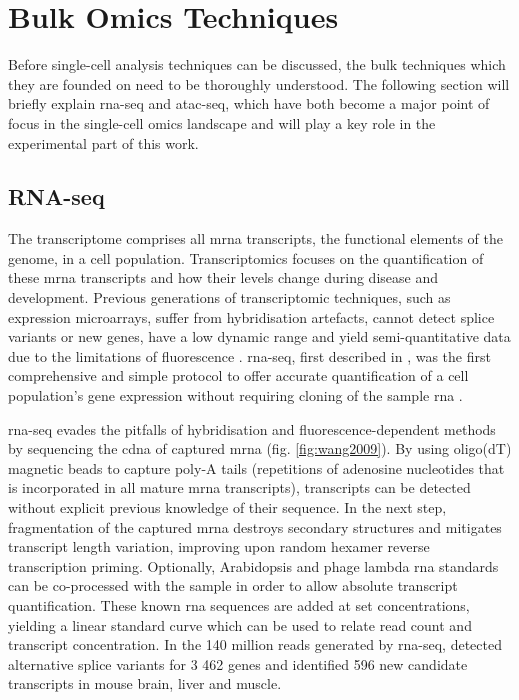 %

\newpage
\section{Bulk Omics Techniques}
\label{sec:lit_bulk}
Before single-cell analysis techniques can be discussed, the bulk techniques which they are founded on need to be thoroughly understood. The following section will briefly explain \acrshort{rna-seq} and \acrshort{atac-seq}, which have both become a major point of focus in the single-cell omics landscape and will play a key role in the experimental part of this work.\pms

\subsection{RNA-seq}
\label{subsect:lit_rna-seq}
The transcriptome comprises all \acrshort{mrna} transcripts, the functional elements of the genome, in a cell population. Transcriptomics focuses on the quantification of these \acrshort{mrna} transcripts and how their levels change during disease and development. Previous generations of transcriptomic techniques, such as expression microarrays, suffer from hybridisation artefacts, cannot detect splice variants or new genes, have a low dynamic range and yield semi-quantitative data due to the limitations of fluorescence \citep{wang2009, tang2011}. \acrshort{rna-seq}, first described in \citeyear{mortazavi2008}, was the first comprehensive and simple protocol to offer accurate quantification of a cell population's gene expression without requiring cloning of the sample \acrshort{rna} \citep{mortazavi2008}.\pms

\acrshort{rna-seq} evades the pitfalls of hybridisation and fluorescence-dependent methods by sequencing the \acrshort{cdna} of captured \acrshort{mrna} (fig. \ref{fig:wang2009}). By using oligo(dT) magnetic beads to capture poly-A tails (repetitions of adenosine nucleotides that is incorporated in all mature \acrshort{mrna} transcripts), transcripts can be detected without explicit previous knowledge of their sequence. In the next step, fragmentation of the captured \acrshort{mrna} destroys secondary structures and mitigates transcript length variation, improving upon random hexamer reverse transcription priming. Optionally, Arabidopsis and phage lambda \acrshort{rna} standards can be co-processed with the sample in order to allow absolute transcript quantification. These known \acrshort{rna} sequences are added at set concentrations, yielding a linear standard curve which can be used to relate read count and transcript concentration. In the 140 million reads generated by \acrshort{rna-seq}, \citeauthor{mortazavi2008} detected alternative splice variants for 3 462 genes and identified 596 new candidate transcripts in mouse brain, liver and muscle.\pms

